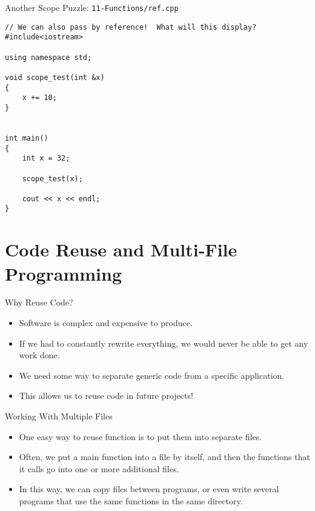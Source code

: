 \documentclass[]{beamer}
\begin{document}
\begin{frame}[fragile]{Another Scope Puzzle: \texttt{11-Functions/ref.cpp}}
\begin{adjustbox}{max totalheight=0.9\textheight, max width=0.95\textwidth}
\begin{BVerbatim}
// We can also pass by reference!  What will this display?
#include<iostream>

using namespace std;

void scope_test(int &x)
{
    x += 10;
}


int main()
{
    int x = 32;

    scope_test(x);

    cout << x << endl;
}
\end{BVerbatim}
\end{adjustbox}
\end{frame}



\section{Code Reuse and Multi-File Programming}
\begin{frame}{Why Reuse Code?}
    \begin{itemize}[<+(1)->]
        \item Software is complex and expensive to produce.
        \item If we had to constantly rewrite everything, we would 
            never be able to get any work done.
        \item We need some way to separate generic code from a 
            specific application.
        \item This allows us to reuse code in future projects!
    \end{itemize}
\end{frame}

\begin{frame}{Working With Multiple Files}
    \begin{itemize}[<+->]
        \item One easy way to reuse function is to put them into 
            separate files.
        \item Often, we put a main function into a file by itself,
            and then the functions that it calls go into one or
            more additional files.
        \item In this way, we can copy files between programs, or
            even write several programs that use the same functions in
            the same directory.
    \end{itemize}
\end{frame}
\end{document}
